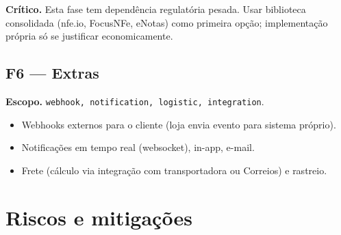 \documentclass[11pt,a4paper]{article}
\begin{document}
\textbf{Crítico.} Esta fase tem dependência regulatória pesada. Usar
biblioteca consolidada (nfe.io, FocusNFe, eNotas) como primeira opção;
implementação própria só se justificar economicamente.

\subsection{F6 --- Extras}

\textbf{Escopo.} \texttt{webhook, notification, logistic, integration}.

\begin{itemize}[leftmargin=2em]
  \item Webhooks externos para o cliente (loja envia evento para sistema
        próprio).
  \item Notificações em tempo real (websocket), in-app, e-mail.
  \item Frete (cálculo via integração com transportadora ou Correios) e
        rastreio.
\end{itemize}

\section{Riscos e mitigações}
\end{document}
